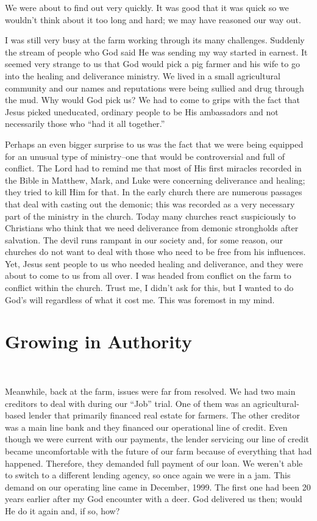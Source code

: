 \documentclass[twoside, 12pt]{book}
\begin{document}
We were about to find out very quickly. It was good that it was quick so we wouldn’t think about it too long and hard; we may have reasoned our way out.

I was still very busy at the farm working through its many challenges. Suddenly the stream of people who God said He was sending my way started in earnest. It seemed very strange to us that God would pick a pig farmer and his wife to go into the healing and deliverance ministry. We lived in a small agricultural community and our names and reputations were being sullied and drug through the mud. Why would God pick us? We had to come to grips with the fact that Jesus picked uneducated, ordinary people to be His ambassadors and not necessarily those who “had it all together.” 

Perhaps an even bigger surprise to us was the fact that we were being equipped for an unusual type of ministry--one that would be controversial and full of conflict. The Lord had to remind me that most of His first miracles recorded in the Bible in Matthew, Mark, and Luke were concerning deliverance and healing; they tried to kill Him for that. In the early church there are numerous passages that deal with casting out the demonic; this was recorded as a very necessary part of the ministry in the church. Today many churches react suspiciously to Christians who think that we need deliverance from demonic strongholds after salvation. The devil runs rampant in our society and, for some reason, our churches do not want to deal with those who need to be free from his influences. Yet, Jesus sent people to us who needed healing and deliverance, and they were about to come to us from all over. I was headed from conflict on the farm to conflict within the church. Trust me, I didn’t ask for this, but I wanted to do God’s will regardless of what it cost me. This was foremost in my mind.



\chapter{Growing in Authority}
\

Meanwhile, back at the farm, issues were far from resolved. We had two main creditors to deal with during our “Job” trial. One of them was an agricultural-based lender that primarily financed real estate for farmers. The other creditor was a main line bank and they financed our operational line of credit. Even though we were current with our payments, the lender servicing our line of credit became uncomfortable with the future of our farm because of everything that had happened. Therefore, they demanded full payment of our loan. We weren’t able to switch to a different lending agency, so once again we were in a jam. This demand on our operating line came in December, 1999. The first one had been 20 years earlier after my God encounter with a deer. God delivered us then; would He do it again and, if so, how?
\end{document}
